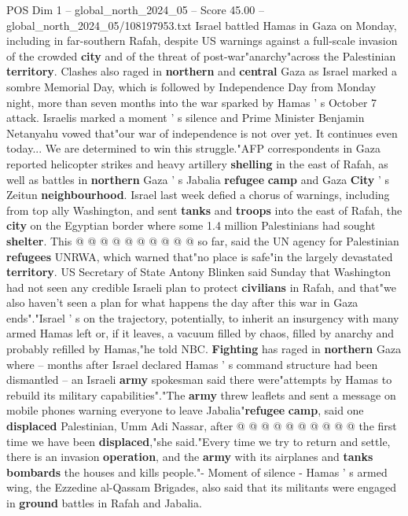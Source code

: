 \begin{textsample}{POS Dim 1 – global\_north\_2024\_05 – Score 45.00 – global\_north\_2024\_05/108197953.txt}  \label{ex:f1_pos_275}
Israel battled Hamas in Gaza on Monday, including in far-southern Rafah, despite US warnings against a full-scale invasion of the crowded \textbf{city} and of the threat of post-war"anarchy"across the Palestinian \textbf{territory}.
Clashes also raged in \textbf{northern} and \textbf{central} Gaza as Israel marked a sombre Memorial Day, which is followed by Independence Day from Monday night, more than seven months into the war sparked by Hamas ' s October 7 attack.
Israelis marked a moment ' s silence and Prime Minister Benjamin Netanyahu vowed that"our war of independence is not over yet.
It continues even today...
We are determined to win this struggle."AFP correspondents in Gaza reported helicopter strikes and heavy artillery \textbf{shelling} in the east of Rafah, as well as battles in \textbf{northern} Gaza ' s Jabalia \textbf{refugee} \textbf{camp} and Gaza \textbf{City} ' s Zeitun \textbf{neighbourhood}.
Israel last week defied a chorus of warnings, including from top ally Washington, and sent \textbf{tanks} and \textbf{troops} into the east of Rafah, the \textbf{city} on the Egyptian border where some 1.4 million Palestinians had sought \textbf{shelter}.
This @ @ @ @ @ @ @ @ @ @ so far, said the UN agency for Palestinian \textbf{refugees} UNRWA, which warned that"no place is safe"in the largely devastated \textbf{territory}.
US Secretary of State Antony Blinken said Sunday that Washington had not seen any credible Israeli plan to protect \textbf{civilians} in Rafah, and that"we also haven't seen a plan for what happens the day after this war in Gaza ends"."Israel ' s on the trajectory, potentially, to inherit an insurgency with many armed Hamas left or, if it leaves, a vacuum filled by chaos, filled by anarchy and probably refilled by Hamas,"he told NBC. \textbf{Fighting} has raged in \textbf{northern} Gaza where -- months after Israel declared Hamas ' s command structure had been dismantled -- an Israeli \textbf{army} spokesman said there were"attempts by Hamas to rebuild its military capabilities"."The \textbf{army} threw leaflets and sent a message on mobile phones warning everyone to leave Jabalia"\textbf{refugee} \textbf{camp}, said one \textbf{displaced} Palestinian, Umm Adi Nassar, after @ @ @ @ @ @ @ @ @ @ the first time we have been \textbf{displaced},"she said."Every time we try to return and settle, there is an invasion \textbf{operation}, and the \textbf{army} with its airplanes and \textbf{tanks} \textbf{bombards} the houses and kills people."- Moment of silence - Hamas ' s armed wing, the Ezzedine al-Qassam Brigades, also said that its militants were engaged in \textbf{ground} battles in Rafah and Jabalia.

\end{textsample}
